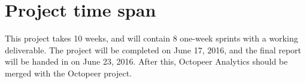 \documentclass{article}
\begin{document}
\section{Project time span} \label{section:projecttimespan}
This project takes 10 weeks, and will contain 8 one-week sprints with a working deliverable. The project will be completed on June 17, 2016, and the final report will be handed in on June 23, 2016. After this, Octopeer Analytics should be merged with the Octopeer project.

\printbibliography 
\end{document}
